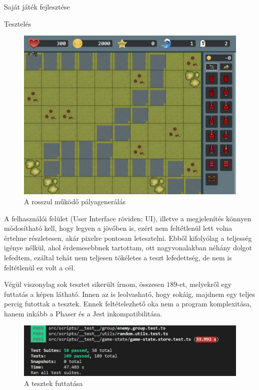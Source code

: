 \begin{MyChapter}{Saját játék fejlesztése}
\begin{MySection}{Tesztelés}
 		\begin{figure}[H]
	 		\centering
	 		\includegraphics[scale=0.5]{kepek/teszt/tesztRosszPelda}
		 	\caption{A rosszul működő pályagenerálás}
		 	\label{fig:test:mapgen}
		\end{figure}
	
		A felhasználói felület (User Interface röviden: UI), illetve a megjelenítés könnyen módosítható kell, hogy legyen a jövőben is, ezért nem feltétlenül lett volna értelme részletesen, akár pixelre pontosan letesztelni. 
		Ebből kifolyólag a teljesség igénye nélkül, ahol érdemesebbnek tartottam, ott nagyvonalakban néhány dolgot lefedtem, ezáltal tehát nem teljesen tökéletes a teszt lefedettség, de nem is feltétlenül ez volt a cél.
		
		Végül viszonylag sok tesztet sikerült írnom, összesen $189$-et, melyekről egy futtatás a  képen látható. Innen az is leolvasható, hogy sokáig, majdnem egy teljes percig futottak a tesztek. Ennek feltételezhető oka nem a program komplexitása, hanem inkább a Phaser és a Jest inkompatibilitása.
		
 		\begin{figure}[H]
			\centering
			\includegraphics[scale=0.75]{kepek/teszt/testFuttatas}
			\caption{A tesztek futtatása}
			\label{fig:test:run}
		\end{figure}
	

\end{MySection}
\end{MyChapter}
